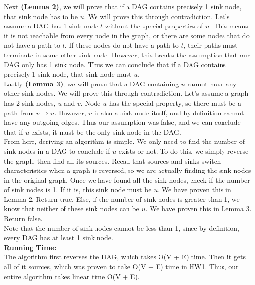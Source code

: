 \documentclass{exam}
\begin{document}
\begin{questions}
\begin{parts}
Next {\bf (Lemma 2)}, we will prove that if a DAG contains precisely 1 sink node, that sink node has to be $u$. We will prove this through contradiction. Let's assume a DAG has 1 sink node $t$ without the special properties of $u$. This means it is not reachable from every node in the graph, or there are some nodes that do not have a path to $t$. If these nodes do not have a path to $t$, their paths must terminate in some other sink node. However, this breaks the assumption that our DAG only has 1 sink node. Thus we can conclude that if a DAG contains precisely 1 sink node, that sink node must $u$.\\

Lastly {\bf (Lemma 3)}, we will prove that a DAG containing $u$ cannot have any other sink nodes. We will prove this through contradiction. Let's assume a graph has 2 sink nodes, $u$ and $v$. Node $u$ has the special property, so there must be a path from $v \rightarrow u$. However, $v$ is also a sink node itself, and by definition cannot have any outgoing edges. Thus our assumption was false, and we can conclude that if $u$ exists, it must be the only sink node in the DAG.\\

From here, deriving an algorithm is simple. We only need to find the number of sink nodes in a DAG to conclude if $u$ exists or not. To do this, we simply reverse the graph, then find all its sources. Recall that sources and sinks switch characteristics when a graph is reversed, so we are actually finding the sink nodes in the original graph. Once we have found all the sink nodes, check if the number of sink nodes is 1. If it is, this sink node must be $u$. We have proven this in Lemma 2. Return true. Else, if the number of sink nodes is greater than 1, we know that neither of these sink nodes can be $u$. We have proven this in Lemma 3. Return false.\\

Note that the number of sink nodes cannot be less than 1, since by definition, every DAG has at least 1 sink node.\\

{\bf Running Time:}\\
The algorithm first reverses the DAG, which takes O(V + E) time. Then it gets all of it sources, which was proven to take O(V + E) time in HW1. Thus, our entire algorithm takes linear time O(V + E).\\


\end{parts}
\end{questions}
\end{document}
